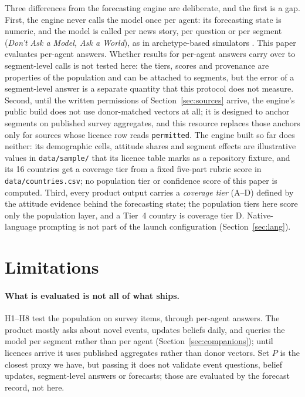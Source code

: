 \documentclass[10pt]{article}
\newcommand{\companion}[1]{\emph{#1}}
\begin{document}
Three differences from the forecasting engine are deliberate, and the first is a gap. First, the engine never calls the model once per agent: its forecasting state is numeric, and the model is called per news story, per question or per segment (\companion{Don't Ask a Model, Ask a World}), as in archetype-based simulators \citep{chopra2024limits}. This paper evaluates per-agent answers. Whether results for per-agent answers carry over to segment-level calls is not tested here: the tiers, scores and provenance are properties of the population and can be attached to segments, but the error of a segment-level answer is a separate quantity that this protocol does not measure. Second, until the written permissions of Section~\ref{sec:sources} arrive, the engine's public build does not use donor-matched vectors at all; it is designed to anchor segments on published survey aggregates, and this resource replaces those anchors only for sources whose licence row reads \texttt{permitted}. The engine built so far does neither: its demographic cells, attitude shares and segment effects are illustrative values in \nolinkurl{data/sample/} that its licence table marks as a repository fixture, and its 16 countries get a coverage tier from a fixed five-part rubric score in \nolinkurl{data/countries.csv}; no population tier or confidence score of this paper is computed. Third, every product output carries a \emph{coverage tier} (A--D) defined by the attitude evidence behind the forecasting state; the population tiers here score only the population layer, and a Tier~4 country is coverage tier D. Native-language prompting is not part of the launch configuration (Section~\ref{sec:lang}).

\section{Limitations}
\label{sec:limits}

\paragraph{What is evaluated is not all of what ships.} H1--H8 test the population on survey items, through per-agent answers. The product mostly asks about novel events, updates beliefs daily, and queries the model per segment rather than per agent (Section~\ref{sec:companions}); until licences arrive it uses published aggregates rather than donor vectors. Set $P$ is the closest proxy we have, but passing it does not validate event questions, belief updates, segment-level answers or forecasts; those are evaluated by the forecast record, not here.
\end{document}

